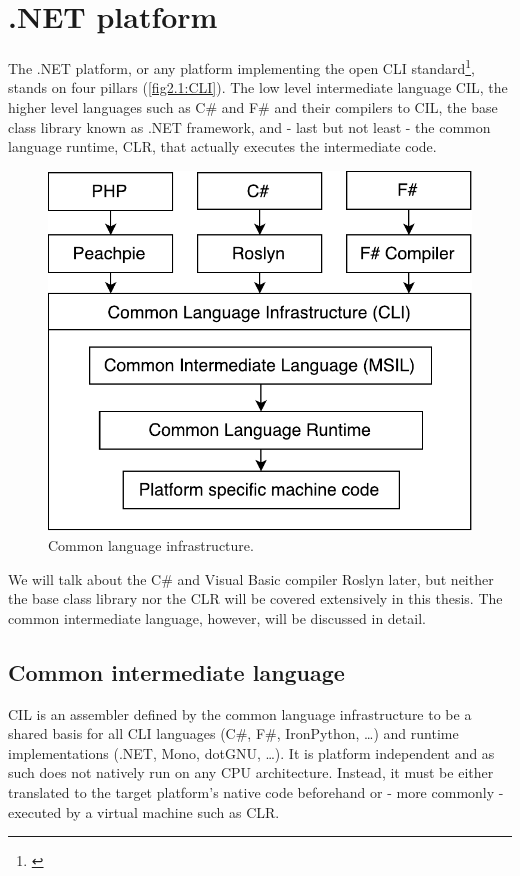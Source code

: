 \chapter{.NET platform}

The .NET platform, or any platform implementing the open CLI standard\footnote{\citep{CLIEcma}}, stands on four pillars (\autoref{fig2.1:CLI}). The low level intermediate language CIL, the higher level languages such as C\# and F\# and their compilers to CIL, the base class library known as .NET framework, and - last but not least - the common language runtime, CLR, that actually executes the intermediate code.

\begin{figure}[h]
	\centering	
	\includegraphics[scale=0.75]{../img/2_1_CLI}	
	\caption{Common language infrastructure.}
	\label{fig2.1:CLI}
\end{figure}

We will talk about the C\# and Visual Basic compiler Roslyn later, but neither the base class library nor the CLR will be covered extensively in this thesis. The common intermediate language, however, will be discussed in detail. 

\section{Common intermediate language}\label{CIL}

CIL is an assembler defined by the common language infrastructure \citep{CLIEcma}\nocite{CSharpEcma} to be a shared basis for all CLI languages (C\#, F\#, IronPython, …) and runtime implementations (.NET, Mono, dotGNU, …). It is platform independent and as such does not natively run on any CPU architecture. Instead, it must be either translated to the target platform’s native code beforehand or - more commonly - executed by a virtual machine such as CLR.

